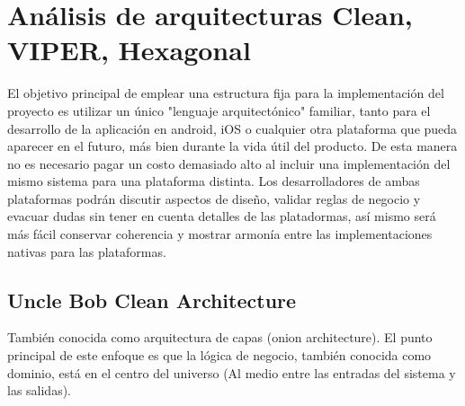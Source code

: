 
\chapter{Análisis de arquitecturas Clean, VIPER, Hexagonal} %

\label{Chapter2} %

El objetivo principal de emplear una estructura fija para la implementación del proyecto es utilizar un único "lenguaje arquitectónico" familiar, tanto para el desarrollo de la aplicación en android, iOS o cualquier otra plataforma que pueda aparecer en el futuro, más bien durante la vida útil del producto. De esta manera no es necesario pagar un costo demasiado alto al incluir una implementación del mismo sistema para una plataforma distinta. 
Los desarrolladores de ambas plataformas podrán discutir aspectos de diseño, validar reglas de negocio y evacuar dudas sin tener en cuenta detalles de las platadormas, así mismo será más fácil conservar coherencia y mostrar armonía entre las implementaciones nativas para las plataformas.

\section{Uncle Bob Clean Architecture}

También conocida como arquitectura de capas (onion architecture). El punto principal de este enfoque es que la lógica de negocio, también conocida como dominio, está en el centro del universo (Al medio entre las entradas del sistema y las salidas).
